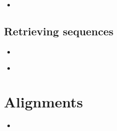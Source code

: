 \documentclass[compress, ucs, xelatex, 11pt, xcolor=x11names, aspectratio=1609,
	hyperref={
		bookmarks=true,
		unicode=true,
		colorlinks=true,
		pdftitle={HybSeq course},
		plainpages=false,
		pdfauthor={Vojtech Zeisek},
		pdfsubject={Practical processing of HybSeq target enrichment sequencing data on computing grids like MetaCentrum},
		pdfcreator={XeLaTeX},
		pdfkeywords={BASH, command line, GNU, HybSeq, Linux, MetaCentrum, sequencing shell, target enrichment},
		linkcolor=Cyan2, %
		anchorcolor=Firebrick2, %
		citecolor=Firebrick2, %
		filecolor=Firebrick2, %
		menucolor=Firebrick2, %
		urlcolor=Chartreuse2, %
		pdftex},
	url={hyphens, lowtilde} %
	]{beamer}
\begin{document}
\begin{frame}[fragile]{}
	\begin{itemize}
		\item 
	\end{itemize}
	\begin{spluscode}
    
	\end{spluscode}
	\begin{bashcode}
    
	\end{bashcode}
\end{frame}

\subsection{Retrieving sequences}

\begin{frame}[fragile]{}
	\begin{itemize}
		\item 
	\end{itemize}
	\begin{spluscode}
    
	\end{spluscode}
	\begin{bashcode}
    
	\end{bashcode}
\end{frame}

\begin{frame}[fragile]{}
	\begin{itemize}
		\item 
	\end{itemize}
	\begin{spluscode}
    
	\end{spluscode}
	\begin{bashcode}
    
	\end{bashcode}
\end{frame}

\section{Alignments}

\begin{frame}[fragile]{}
	\begin{itemize}
		\item 
	\end{itemize}
	\begin{spluscode}
    
	\end{spluscode}
	\begin{bashcode}
    
	\end{bashcode}
\end{frame}
\end{document}
